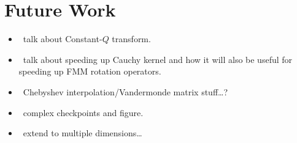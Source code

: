\section{Future Work}

\begin{itemize}
\item \TODO\ talk about Constant-$Q$ transform.
\item \TODO\ talk about speeding up Cauchy kernel and how it will also
  be useful for speeding up FMM rotation operators.
\item \TODO\ Chebyshev interpolation/Vandermonde matrix stuff\ldots?
\item \TODO\ complex checkpoints and figure.
\item \TODO\ extend to multiple dimensions\ldots
\end{itemize}

